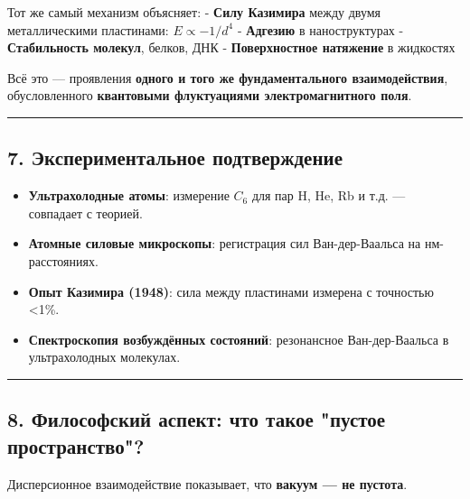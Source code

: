 \documentclass[11pt]{article}
\providecommand{\tightlist}{%
      \setlength{\itemsep}{0pt}\setlength{\parskip}{0pt}}
\begin{document}
Тот же самый механизм объясняет: - \textbf{Силу Казимира} между двумя
металлическими пластинами: \(E \propto -1/d^4\) - \textbf{Адгезию} в
наноструктурах - \textbf{Стабильность молекул}, белков, ДНК -
\textbf{Поверхностное натяжение} в жидкостях

Всё это --- проявления \textbf{одного и того же фундаментального
взаимодействия}, обусловленного \textbf{квантовыми флуктуациями
электромагнитного поля}.

\begin{center}\rule{0.5\linewidth}{\linethickness}\end{center}

\subsection{7. Экспериментальное
подтверждение}\label{ux44dux43aux441ux43fux435ux440ux438ux43cux435ux43dux442ux430ux43bux44cux43dux43eux435-ux43fux43eux434ux442ux432ux435ux440ux436ux434ux435ux43dux438ux435}

\begin{itemize}
\tightlist
\item
  \textbf{Ультрахолодные атомы}: измерение \(C_6\) для пар H, He, Rb и
  т.д. --- совпадает с теорией.
\item
  \textbf{Атомные силовые микроскопы}: регистрация сил Ван-дер-Ваальса
  на нм-расстояниях.
\item
  \textbf{Опыт Казимира (1948)}: сила между пластинами измерена с
  точностью \textless{}1\%.
\item
  \textbf{Спектроскопия возбуждённых состояний}: резонансное
  Ван-дер-Ваальса в ультрахолодных молекулах.
\end{itemize}

\begin{center}\rule{0.5\linewidth}{\linethickness}\end{center}

\subsection{8. Философский аспект: что такое "пустое
пространство"?}\label{ux444ux438ux43bux43eux441ux43eux444ux441ux43aux438ux439-ux430ux441ux43fux435ux43aux442-ux447ux442ux43e-ux442ux430ux43aux43eux435-ux43fux443ux441ux442ux43eux435-ux43fux440ux43eux441ux442ux440ux430ux43dux441ux442ux432ux43e}

Дисперсионное взаимодействие показывает, что \textbf{вакуум --- не
пустота}.
\end{document}
